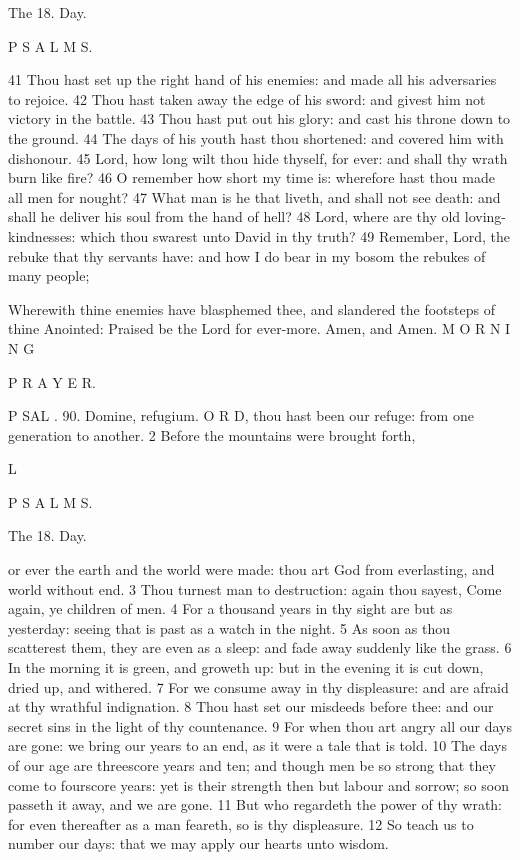 The 18. Day.

P S A L M S.

41 Thou hast set up the right hand of his enemies: and made all his adversaries to rejoice. 42 Thou hast taken away the edge of his sword: and givest him not victory in the battle. 43 Thou hast put out his glory: and cast his throne down to the ground. 44 The days of his youth hast thou shortened: and covered him with dishonour. 45 Lord, how long wilt thou hide thyself, for ever: and shall thy wrath burn like fire? 46 O remember how short my time is: wherefore hast thou made all men for nought? 47 What man is he that liveth, and shall not see death: and shall he deliver his soul from the hand of hell? 48 Lord, where are thy old loving-kindnesses: which thou swarest unto David in thy truth? 49 Remember, Lord, the rebuke that thy servants have: and how I do bear in my bosom the rebukes of many people;

Wherewith thine enemies have blasphemed thee, and slandered the footsteps of thine Anointed: Praised be the Lord for ever-more. Amen, and Amen. M O R N I N G

P R A Y E R.

P SAL . 90. Domine, refugium. O R D, thou hast been our refuge: from one generation to another. 2 Before the mountains were brought forth,

L

P S A L M S.

The 18. Day.

or ever the earth and the world were made: thou art God from everlasting, and world without end. 3 Thou turnest man to destruction: again thou sayest, Come again, ye children of men. 4 For a thousand years in thy sight are but as yesterday: seeing that is past as a watch in the night. 5 As soon as thou scatterest them, they are even as a sleep: and fade away suddenly like the grass. 6 In the morning it is green, and groweth up: but in the evening it is cut down, dried up, and withered. 7 For we consume away in thy displeasure: and are afraid at thy wrathful indignation. 8 Thou hast set our misdeeds before thee: and our secret sins in the light of thy countenance. 9 For when thou art angry all our days are gone: we bring our years to an end, as it were a tale that is told. 10 The days of our age are threescore years and ten; and though men be so strong that they come to fourscore years: yet is their strength then but labour and sorrow; so soon passeth it away, and we are gone. 11 But who regardeth the power of thy wrath: for even thereafter as a man feareth, so is thy displeasure. 12 So teach us to number our days: that we may apply our hearts unto wisdom.


